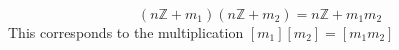 \documentclass[16pt,a4paper]{article}
\theoremstyle{definition}
\begin{document}
\[(n\mathbb{Z}+m_1)(n\mathbb{Z}+m_2) = n\mathbb{Z}+m_1m_2\]
This corresponds to the multiplication $[m_1][m_2] = [m_1m_2]$ 












































































































 
\end{document}
